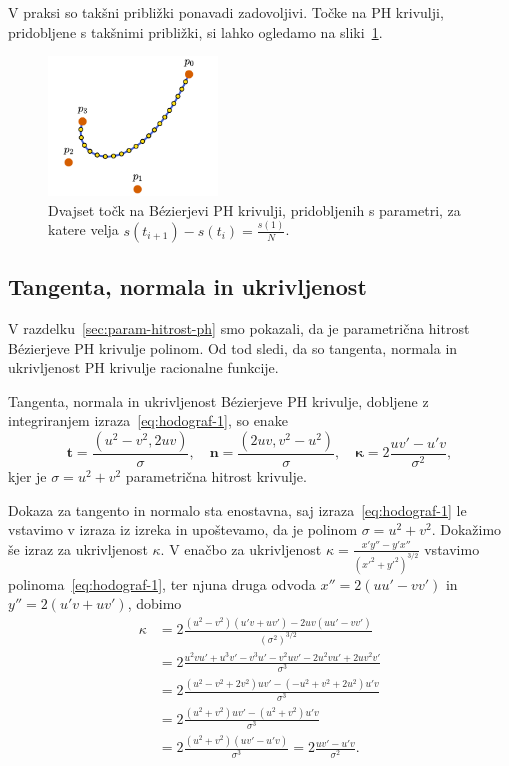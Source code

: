 \documentclass[isrm2, tisk]{fmfdelo}
\begin{document}
    V praksi so takšni približki ponavadi zadovoljivi.
    Točke na PH krivulji, pridobljene s takšnimi približki, si lahko ogledamo na sliki~\ref{fig:enakomerni-s}.
    \begin{figure}[h]
        \centering
        \includegraphics[width = 0.40\textwidth]{images/enakomerni-s}
        \caption{Dvajset točk na Bézierjevi PH krivulji, pridobljenih s parametri, za katere velja $s(t_{i+1})-s(t_i)= \frac{s(1)}{N}$.}
        \label{fig:enakomerni-s}
    \end{figure}

    \subsection{Tangenta, normala in ukrivljenost}
    V razdelku~\ref{sec:param-hitrost-ph} smo pokazali, da je parametrična hitrost Bézierjeve PH krivulje polinom.
    Od tod sledi, da so tangenta, normala in ukrivljenost PH krivulje racionalne funkcije.
    \begin{izrek}
        Tangenta, normala in ukrivljenost Bézierjeve PH krivulje, dobljene z integriranjem izraza~\eqref{eq:hodograf-1}, so enake
        \[\mathbf{t}=\frac{(u^2-v^2,2uv)}{\sigma}, \quad \mathbf{n}=\frac{(2uv,v^2-u^2)}{\sigma},\quad \mathbf{\kappa}=2\frac{uv'-u'v}{\sigma^2},\]
        kjer je $\sigma = u^2+v^2$ parametrična hitrost krivulje.
    \end{izrek}
    \begin{dokaz}
        Dokaza za tangento in normalo sta enostavna, saj izraza~\eqref{eq:hodograf-1} le vstavimo v izraza iz izreka in upoštevamo, da je polinom $\sigma = u^2+v^2$.
        Dokažimo še izraz za ukrivljenost $\kappa$.
        V enačbo za ukrivljenost  $\kappa = \frac{x'y''-y'x''}{(x'^2+y'^2)^{3/2}}$ vstavimo polinoma~\eqref{eq:hodograf-1}, ter njuna druga odvoda $x'' = 2(uu'-vv')$ in $y'' = 2(u'v+uv')$, dobimo
        \begin{align*}
            \kappa &= 2\frac{(u^2-v^2)(u'v+uv') - 2uv(uu'-vv')}{(\sigma^2)^{3/2}}\\
            &= 2\frac{u^2vu' + u^3v' - v^3u' - v^2uv' - 2u^2vu'+2uv^2v'}{\sigma^{3}} \\
            &= 2\frac{(u^2-v^2+2v^2)uv' - (-u^2+v^2+2u^2)u'v}{\sigma^{3}} \\
            &= 2\frac{(u^2+v^2)uv' - (u^2+v^2)u'v}{\sigma^{3}} \\
            &= 2\frac{(u^2+v^2)(uv' - u'v)}{\sigma^{3}} = 2\frac{uv' - u'v}{\sigma^{2}}.
        \end{align*}
    \end{dokaz}
\end{document}
